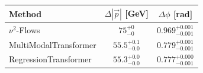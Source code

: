     \begin{tabular}{lcc}
        \toprule
        Method & $\Delta |\vec p|$ [GeV] & $\Delta \phi$ [rad] \\
        \midrule
        $\nu^2$-Flows & $75_{-0}^{+0}$ & $0.969_{-0.001}^{+0.001}$ \\
        MultiModalTransformer & $55.5_{-0.0}^{+0.1}$ & $0.779_{-0.001}^{+0.001}$ \\
        RegressionTransformer & $55.3_{-0.0}^{+0.0}$ & $0.777_{-0.001}^{+0.000}$ \\
        \bottomrule
    \end{tabular}